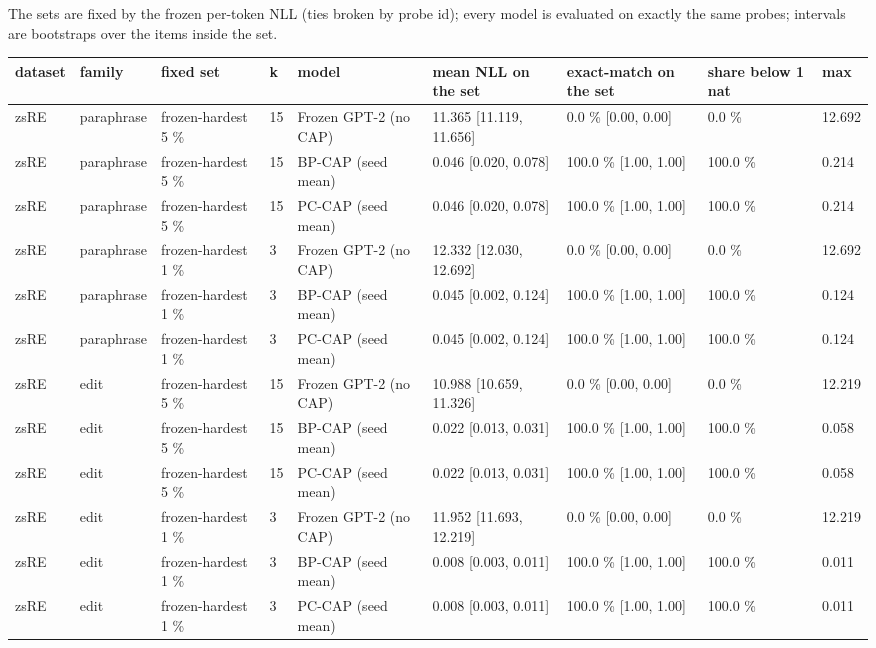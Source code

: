 \documentclass[10pt,a4paper]{article}
\begin{document}
The sets are fixed by the frozen per-token NLL (ties broken by probe id); every model is evaluated on exactly the same probes; intervals are bootstraps over the items inside the set.



\begin{center}\scriptsize
\begin{tabularx}{\textwidth}{@{}p{}XXXXXXXX@{}}
\toprule
dataset & family & fixed set & k & model & mean NLL on the set & exact-match on the set & share below 1 nat & max \\ \midrule
zsRE & paraphrase & frozen-hardest 5 \% & 15 & Frozen GPT-2 (no CAP) & 11.365 [11.119, 11.656] & 0.0 \% [0.00, 0.00] & 0.0 \% & 12.692 \\
zsRE & paraphrase & frozen-hardest 5 \% & 15 & BP-CAP (seed mean) & 0.046 [0.020, 0.078] & 100.0 \% [1.00, 1.00] & 100.0 \% & 0.214 \\
zsRE & paraphrase & frozen-hardest 5 \% & 15 & PC-CAP (seed mean) & 0.046 [0.020, 0.078] & 100.0 \% [1.00, 1.00] & 100.0 \% & 0.214 \\
zsRE & paraphrase & frozen-hardest 1 \% & 3 & Frozen GPT-2 (no CAP) & 12.332 [12.030, 12.692] & 0.0 \% [0.00, 0.00] & 0.0 \% & 12.692 \\
zsRE & paraphrase & frozen-hardest 1 \% & 3 & BP-CAP (seed mean) & 0.045 [0.002, 0.124] & 100.0 \% [1.00, 1.00] & 100.0 \% & 0.124 \\
zsRE & paraphrase & frozen-hardest 1 \% & 3 & PC-CAP (seed mean) & 0.045 [0.002, 0.124] & 100.0 \% [1.00, 1.00] & 100.0 \% & 0.124 \\
zsRE & edit & frozen-hardest 5 \% & 15 & Frozen GPT-2 (no CAP) & 10.988 [10.659, 11.326] & 0.0 \% [0.00, 0.00] & 0.0 \% & 12.219 \\
zsRE & edit & frozen-hardest 5 \% & 15 & BP-CAP (seed mean) & 0.022 [0.013, 0.031] & 100.0 \% [1.00, 1.00] & 100.0 \% & 0.058 \\
zsRE & edit & frozen-hardest 5 \% & 15 & PC-CAP (seed mean) & 0.022 [0.013, 0.031] & 100.0 \% [1.00, 1.00] & 100.0 \% & 0.058 \\
zsRE & edit & frozen-hardest 1 \% & 3 & Frozen GPT-2 (no CAP) & 11.952 [11.693, 12.219] & 0.0 \% [0.00, 0.00] & 0.0 \% & 12.219 \\
zsRE & edit & frozen-hardest 1 \% & 3 & BP-CAP (seed mean) & 0.008 [0.003, 0.011] & 100.0 \% [1.00, 1.00] & 100.0 \% & 0.011 \\
zsRE & edit & frozen-hardest 1 \% & 3 & PC-CAP (seed mean) & 0.008 [0.003, 0.011] & 100.0 \% [1.00, 1.00] & 100.0 \% & 0.011 \\

\end{tabularx}
\end{center}
\end{document}
